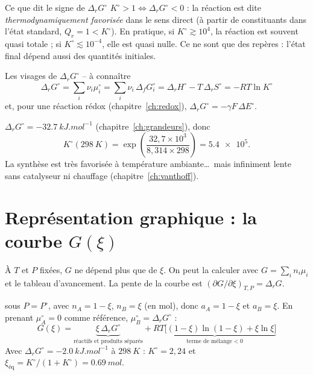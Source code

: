 \begin{resultat}{Ce que dit le signe de $\Delta_rG^\circ$}
$K^\circ > 1 \Leftrightarrow \Delta_rG^\circ < 0$ : la réaction est dite \emph{thermodynamiquement favorisée} dans le sens direct (à partir de constituants dans l'état standard, $Q_r = 1 < K^\circ$). En pratique, si $K^\circ \gtrsim 10^4$, la réaction est souvent quasi totale ; si $K^\circ \lesssim 10^{-4}$, elle est quasi nulle. Ce ne sont que des repères : l'état final dépend aussi des quantités initiales.
\end{resultat}

\begin{resultat}{Les visages de $\Delta_rG^\circ$ -- à connaître}
\[ \Delta_rG^\circ = \sum_i\nu_i\mu_i^\circ = \sum_i\nu_i\,\Delta_fG^\circ_i = \Delta_rH^\circ - T\,\Delta_rS^\circ = -RT\ln K^\circ \]
et, pour une réaction rédox (chapitre~\ref{ch:redox}), $\Delta_rG^\circ = -\gamma F\,\Delta E^\circ$.
\end{resultat}

\begin{exemple}[ammoniac à $\SI{298}{K}$]
$\Delta_rG^\circ = \SI{-32,7}{kJ.mol^{-1}}$ (chapitre~\ref{ch:grandeurs}), donc
\[ K^\circ(\SI{298}{K}) = \exp\left(\frac{32{,}7\times10^3}{8{,}314\times298}\right) = \num{5,4e5}. \]
La synthèse est très favorisée à température ambiante\dots\ mais infiniment lente sans catalyseur ni chauffage (chapitre~\ref{ch:vanthoff}).
\end{exemple}

\section{Représentation graphique : la courbe $G(\xi)$}

À $T$ et $P$ fixées, $G$ ne dépend plus que de $\xi$. On peut la calculer avec $G = \sum_in_i\mu_i$ et le tableau d'avancement. La pente de la courbe est $\left(\partial G/\partial\xi\right)_{T,P} = \Delta_rG$.

\begin{exemple}
 sous $P = P^\circ$, avec $n_A = 1-\xi$, $n_B = \xi$ (en mol), donc $a_A = 1-\xi$ et $a_B = \xi$. En prenant $\mu_A^\circ = 0$ comme référence, $\mu_B^\circ = \Delta_rG^\circ$ :
\[ G(\xi) = \underbrace{\xi\,\Delta_rG^\circ}_{\text{réactifs et produits séparés}} + \underbrace{RT\big[(1-\xi)\ln(1-\xi) + \xi\ln\xi\big]}_{\text{terme de mélange}<0} \]
Avec $\Delta_rG^\circ = \SI{-2,0}{kJ.mol^{-1}}$ à $\SI{298}{K}$ : $K^\circ = 2{,}24$ et $\xi_{\text{éq}} = K^\circ/(1+K^\circ) = \SI{0,69}{mol}$.
\end{exemple}

